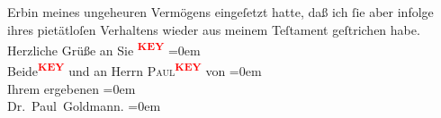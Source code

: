 \begin{ledgroupsized}[t]{13cm}
               Erbin meines ungeheuren Vermögens eingeſetzt hatte, daß ich ſie aber infolge ihres
               pietätloſen Verhaltens wieder {\pb}
               aus meinem Teſtament geſtrichen habe. {\\[\baselineskip]}Herzliche Grüße an Sie \textcolor{red}{\textsuperscript{\textbf{KEY}}}\pend
           \leftskip=0em{}\pstart
           {\\[\baselineskip]}Beide\textcolor{red}{\textsuperscript{\textbf{KEY}}} und an Herrn \textsc{Paul\textcolor{red}{\textsuperscript{\textbf{KEY}}}} von\pend
           \leftskip=0em{}\pstart
           {\\[\baselineskip]}Ihrem ergebenen\pend
           \leftskip=0em{}\pstart
           {\\[\baselineskip]}\spacefill\mbox{Dr. Paul Goldmann.}\pend
           \leftskip=0em{}
         
         \endnumbering{}\end{ledgroupsized}\begin{anhang}\end{anhang}\newcommand{\dateiname}{L03530}\newcommand{\titel}{Paul Goldmann an Olga XXXX Gussmann/Schnitzler, 29. 4. [XXXX]}\newcommand{\editorInnen}{Martin Anton Müller und Laura Untner}
      